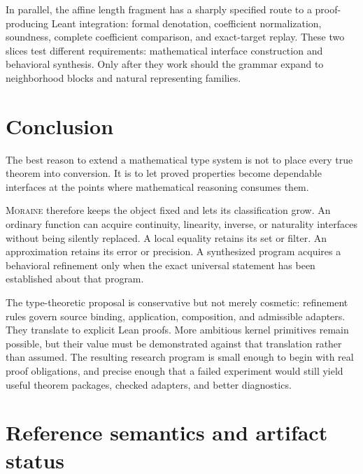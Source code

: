 \documentclass[11pt,letterpaper]{article}
\newcommand{\moraine}{\textsc{Moraine}}
\theoremstyle{definition}
\theoremstyle{remark}
\begin{document}
In parallel, the affine length fragment has a sharply specified route to a
proof-producing Leant integration: formal denotation, coefficient normalization,
soundness, complete coefficient comparison, and exact-target replay. These two
slices test different requirements: mathematical interface construction and
behavioral synthesis. Only after they work should the grammar expand to
neighborhood blocks and natural representing families.

\section{Conclusion}
The best reason to extend a mathematical type system is not to place every
true theorem into conversion. It is to let proved properties become dependable
interfaces at the points where mathematical reasoning consumes them.

\moraine{} therefore keeps the object fixed and lets its classification grow.
An ordinary function can acquire continuity, linearity, inverse, or naturality
interfaces without being silently replaced. A local equality retains its set or
filter. An approximation retains its error or precision. A synthesized program
acquires a behavioral refinement only when the exact universal statement has
been established about that program.

The type-theoretic proposal is conservative but not merely cosmetic: refinement
rules govern source binding, application, composition, and admissible adapters.
They translate to explicit Lean proofs. More ambitious kernel primitives remain
possible, but their value must be demonstrated against that translation rather
than assumed. The resulting research program is small enough to begin with
real proof obligations, and precise enough that a failed experiment would still
yield useful theorem packages, checked adapters, and better diagnostics.

\appendix
\section{Reference semantics and artifact status}\label{app:artifacts}
\end{document}
